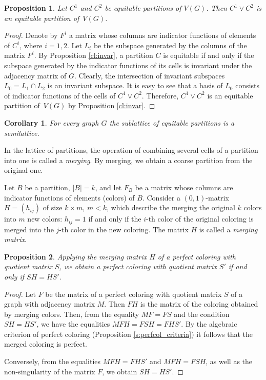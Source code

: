 \documentclass[11pt]{article}
\newtheorem{claim}{Proposition}[section]
\newtheorem{corollary}{Corollary}[section]
\theoremstyle{definition}
\begin{document}
\begin{claim}\label{cl:mincolor}
Let $C^1$ and $C^2$ be equitable partitions of $V(G)$. Then $C^1 \lor C^2$ is an equitable partition of~$V(G)$.
\end{claim}
\begin{proof}
Denote by $F^i$ a matrix whose columns are indicator functions of elements of $C^i$, where $i=1, 2$.
Let $L_i$ be the subspace generated by the columns of the matrix
$F^i$. By Proposition \ref{cl:invar}, 
a partition $C$ is equitable if and only if the subspace generated by the indicator functions of its cells is invariant under the adjacency matrix of $G$.
Clearly, the intersection of invariant
subspaces $L_0= L_1\cap L_2$ is an invariant subspace.  It is easy to see that a basis of $L_0$ consists of indicator functions of  the cells of   $C^1 \lor C^2$.   Therefore,  $C^1 \lor C^2$ is an equitable partition of~$V(G)$ by 
Proposition \ref{cl:invar}.
\end{proof}

\begin{corollary} For every graph $G$ the sublattice of  equitable partitions is a semilattice.
\end{corollary}

In the lattice of partitions, the operation of combining several cells of a partition into one is called a  {\sl merging}. By merging, we obtain a coarse partition  from the original one. 


Let $B$ be a partition, $|B|=k$, and let $F_B$ be a matrix whose columns are indicator functions of elements (colors) of $B$. 
 Consider a $(0,1)$-matrix $H=(h_{ij})$ of size $k\times m$, $m<k$, which
describe the merging the original $k$ colors into
$m$ new colors: $h_{ij}=1$ if and only if the $i$-th color of the original
coloring is merged into the $j$-th color in the new coloring. The matrix $H$ is called  a {\sl merging matrix}.


\begin{claim}\label{merge} Applying the merging matrix  $H$  of a perfect coloring with
quotient matrix $S$, we obtain a perfect coloring with quotient matrix
$S'$ if and only if $SH=HS'$.
\end{claim}
\begin{proof}
Let $F$ be the matrix of a perfect coloring with quotient matrix
$S$ of a graph with adjacency matrix $M$. Then $FH$ is the matrix
of the coloring obtained by merging colors. Then, from the equality $MF=FS$
and the condition $SH=HS'$, we have
the equalities $MFH=FSH=FHS'$. By the algebraic criterion of  perfect coloring (Proposition \ref{s:perfcol_criteria})
it follows that the merged coloring  is  perfect.

Conversely, from the equalities $MFH=FHS'$ and $MFH=FSH$, as well as the non-singularity of the matrix $F$, we obtain $SH=HS'$.
\end{proof}
\end{document}
